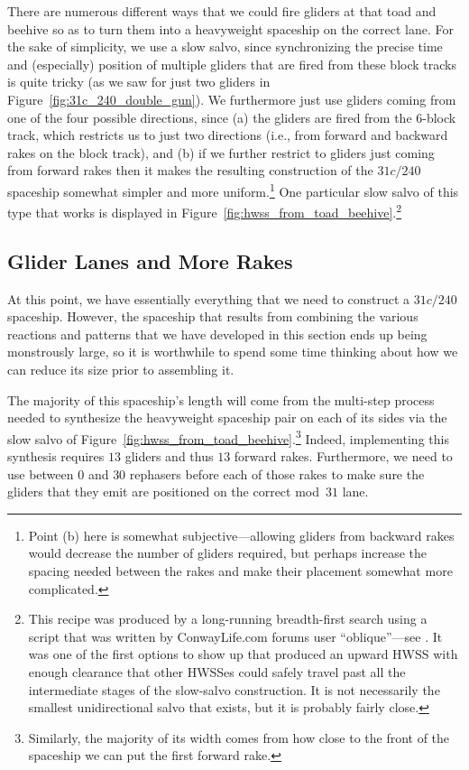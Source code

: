 There are numerous different ways that we could fire gliders at that toad and beehive so as to turn them into a heavyweight spaceship on the correct lane. For the sake of simplicity, we use a slow salvo, since synchronizing the precise time and (especially) position of multiple gliders that are fired from these block tracks is quite tricky (as we saw for just two gliders in Figure~\ref{fig:31c_240_double_gun}). We furthermore just use gliders coming from one of the four possible directions, since (a) the gliders are fired from the $6$-block track, which restricts us to just two directions (i.e., from forward and backward rakes on the block track), and (b) if we further restrict to gliders just coming from forward rakes then it makes the resulting construction of the $31c/240$ spaceship somewhat simpler and more uniform.\footnote{Point (b) here is somewhat subjective---allowing gliders from backward rakes would decrease the number of gliders required, but perhaps increase the spacing needed between the rakes and make their placement somewhat more complicated.} One particular slow salvo of this type that works is displayed in Figure~\ref{fig:hwss_from_toad_beehive}.\footnote{This recipe was produced by a long-running breadth-first search using a script that was written by ConwayLife.com forums user ``oblique''---see . It was one of the first options to show up that produced an upward HWSS with enough clearance that other HWSSes could safely travel past all the intermediate stages of the slow-salvo construction. It is not necessarily the smallest unidirectional salvo that exists, but it is probably fairly close.}


\subsection{Glider Lanes and More Rakes}\label{sec:silverfish_more_rakes}

At this point, we have essentially everything that we need to construct a $31c/240$ spaceship. However, the spaceship that results from combining the various reactions and patterns that we have developed in this section ends up being monstrously large, so it is worthwhile to spend some time thinking about how we can reduce its size prior to assembling it.

The majority of this spaceship's length will come from the multi-step process needed to synthesize the heavyweight spaceship pair on each of its sides via the slow salvo of Figure~\ref{fig:hwss_from_toad_beehive}.\footnote{Similarly, the majority of its width comes from how close to the front of the spaceship we can put the first forward rake.} Indeed, implementing this synthesis requires $13$ gliders and thus $13$ forward rakes. Furthermore, we need to use between $0$ and $30$ rephasers before each of those rakes to make sure the gliders that they emit are positioned on the correct mod~$31$ lane.

